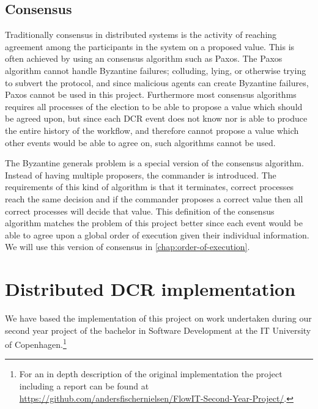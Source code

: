 		
		\subsection{Consensus}
		Traditionally consensus in distributed systems is the activity of reaching agreement among the participants in the system on a proposed value. This is often achieved by using an consensus algorithm such as Paxos\cite{Lamport:1998:PP:279227.279229}. The Paxos algorithm cannot handle Byzantine failures; colluding, lying, or otherwise trying to subvert the protocol, and since malicious agents can create Byzantine failures, Paxos cannot be used in this project. Furthermore most consensus algorithms requires all processes of the election to be able to propose a value which should be agreed upon, but since each DCR event does not know nor is able to produce the entire history of the workflow, and therefore cannot propose a value which other events would be able to agree on, such algorithms cannot be used. 
		
		\newpar The Byzantine generals problem is a special version of the consensus algorithm. Instead of having multiple proposers, the commander is introduced. The requirements of this kind of algorithm is that it terminates, correct processes reach the same decision and if the commander proposes a correct value then all correct processes will decide that value. This definition of the consensus algorithm matches the problem of this project better since each event would be able to agree upon a global order of execution given their individual information. We will use this version of consensus in \autoref{chap:order-of-execution}.

		
	\section{Distributed DCR implementation}
		We have based the implementation of this project on work undertaken during our second year project of the bachelor in Software Development at the IT University of Copenhagen.\footnote{For an in depth description of the original implementation the project including a report can be found at \url{https://github.com/andersfischernielsen/FlowIT-Second-Year-Project/}.}
		
